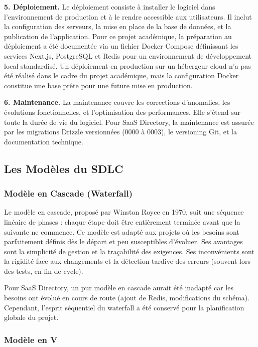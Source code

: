 \textbf{5. Déploiement.} Le déploiement consiste à installer le logiciel dans l'environnement de production et à le rendre accessible aux utilisateurs. Il inclut la configuration des serveurs, la mise en place de la base de données, et la publication de l'application. Pour ce projet académique, la préparation au déploiement a été documentée via un fichier Docker Compose définissant les services Next.js, PostgreSQL et Redis pour un environnement de développement local standardisé. Un déploiement en production sur un hébergeur cloud n'a pas été réalisé dans le cadre du projet académique, mais la configuration Docker constitue une base prête pour une future mise en production.

\textbf{6. Maintenance.} La maintenance couvre les corrections d'anomalies, les évolutions fonctionnelles, et l'optimisation des performances. Elle s'étend sur toute la durée de vie du logiciel. Pour SaaS Directory, la maintenance est assurée par les migrations Drizzle versionnées (0000 à 0003), le versioning Git, et la documentation technique.

\subsection{Les Modèles du SDLC}

\subsubsection{Modèle en Cascade (Waterfall)}

Le modèle en cascade, proposé par Winston Royce en 1970, suit une séquence linéaire de phases : chaque étape doit être entièrement terminée avant que la suivante ne commence. Ce modèle est adapté aux projets où les besoins sont parfaitement définis dès le départ et peu susceptibles d'évoluer. Ses avantages sont la simplicité de gestion et la traçabilité des exigences. Ses inconvénients sont la rigidité face aux changements et la détection tardive des erreurs (souvent lors des tests, en fin de cycle).

Pour SaaS Directory, un pur modèle en cascade aurait été inadapté car les besoins ont évolué en cours de route (ajout de Redis, modifications du schéma). Cependant, l'esprit séquentiel du waterfall a été conservé pour la planification globale du projet.

\subsubsection{Modèle en V}

